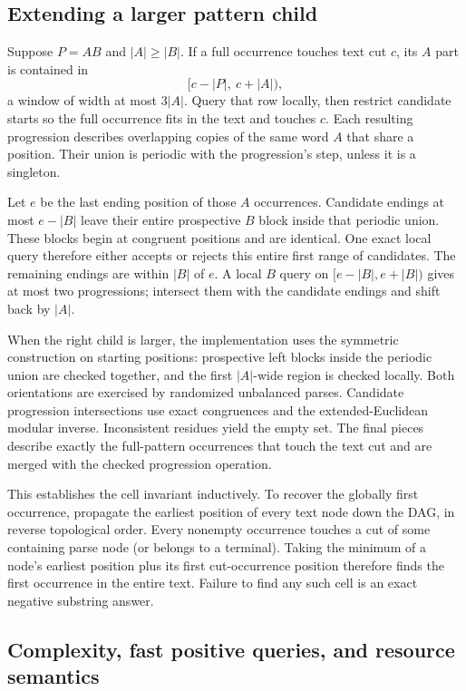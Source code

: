 \subsection{Extending a larger pattern child}

Suppose $P=AB$ and $|A|\ge |B|$. If a full occurrence touches text cut $c$,
its $A$ part is contained in
\[
 [c-|P|,\ c+|A|),
\]
a window of width at most $3|A|$. Query that row locally, then restrict
candidate starts so the full occurrence fits in the text and touches $c$.
Each resulting progression describes overlapping copies of the same word
$A$ that share a position. Their union is periodic with the progression's
step, unless it is a singleton.

Let $e$ be the last ending position of those $A$ occurrences. Candidate
endings at most $e-|B|$ leave their entire prospective $B$ block inside
that periodic union. These blocks begin at congruent positions and are
identical. One exact local query therefore either accepts or rejects this
entire first range of candidates. The remaining endings are within $|B|$
of $e$. A local $B$ query on $[e-|B|,e+|B|)$ gives at most two progressions;
intersect them with the candidate endings and shift back by $|A|$.

When the right child is larger, the implementation uses the symmetric
construction on starting positions: prospective left blocks inside the
periodic union are checked together, and the first $|A|$-wide region is
checked locally. Both orientations are exercised by randomized unbalanced
parses. Candidate progression intersections use exact congruences and the
extended-Euclidean modular inverse. Inconsistent residues yield the empty
set. The final pieces describe exactly the full-pattern occurrences that
touch the text cut and are merged with the checked progression operation.

This establishes the cell invariant inductively. To recover the globally
first occurrence, propagate the earliest position of every text node down
the DAG, in reverse topological order. Every nonempty occurrence touches
a cut of some containing parse node (or belongs to a terminal). Taking
the minimum of a node's earliest position plus its first cut-occurrence
position therefore finds the first occurrence in the entire text. Failure
to find any such cell is an exact negative substring answer.

\subsection{Complexity, fast positive queries, and resource semantics}

